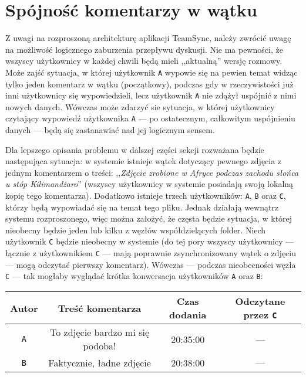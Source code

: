 \section{Spójność komentarzy w wątku}

\label{consistencies}

Z uwagi na rozproszoną architekturę aplikacji TeamSync, należy zwrócić uwagę na możliwość logicznego zaburzenia przepływu dyskusji. Nie ma pewności, że wszyscy użytkownicy w każdej chwili będą mieli ,,aktualną'' wersję rozmowy. Może zajść sytuacja, w której użytkownik \texttt{A} wypowie się na pewien temat widząc tylko jeden komentarz w wątku (początkowy), podczas gdy w rzeczywistości już inni użytkownicy się wypowiedzieli, lecz użytkownik \texttt{A} nie zdążył uspójnić z nimi nowych danych. Wówczas może zdarzyć sie sytuacja, w której użytkownicy czytający wypowiedź użytkownika \texttt{A} --- po ostatecznym, całkowitym uspójnieniu danych --- będą się zastanawiać nad jej logicznym sensem.

Dla lepszego opisania problemu w dalszej części sekcji rozważana będzie następująca sytuacja: w systemie istnieje wątek dotyczący pewnego zdjęcia z jednym komentarzem o treści: ,,\textit{Zdjęcie zrobione w Afryce podczas zachodu słońca u stóp Kilimandżaro}'' (wszyscy użytkownicy w systemie posiadają swoją lokalną kopię tego komentarza). Dodatkowo istnieje trzech użytkowników: \texttt{A}, \texttt{B} oraz \texttt{C}, którzy będą wypowiadać się na temat tego pliku. Jednak działają wewnątrz systemu rozproszonego, więc można założyć, że częsta będzie sytuacja, w której nieobecny będzie jeden lub kilku z węzłów współdzielących folder. Niech użytkownik \texttt{C} będzie nieobecny w systemie (do tej pory wszyscy użytkownicy --- łącznie z użytkownikiem \texttt{C} --- mają poprawnie zsynchronizowany wątek o zdjęciu --- mogą odczytać pierwszy komentarz). Wówczas --- podczas nieobecności węzła \texttt{C} --- tak mogłaby wyglądać krótka konwersacja użytkowników \texttt{A} oraz \texttt{B}:

\vspace{5px}
\begin{center}
\begin{tabular}{c | c | c | c}
 \textbf{Autor} & \textbf{Treść komentarza} & \textbf{Czas dodania} & \textbf{Odczytane przez \texttt{C}}\\
 \hline
 \texttt{A} & To zdjęcie bardzo mi się podoba! & 20:35:00 & --- \\
 \texttt{B} & Faktycznie, ładne zdjęcie & 20:38:00 & ---
\end{tabular}
\end{center}
\vspace{5px}

